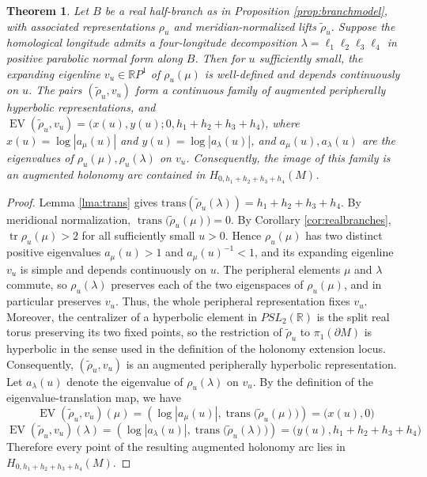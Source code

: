 \documentclass{article}
\theoremstyle{plain}
\newtheorem{theorem}{Theorem}[section]
\theoremstyle{definition}
\theoremstyle{plain}
\theoremstyle{plain}
\theoremstyle{plain}
\theoremstyle{remark}
\theoremstyle{remark}
\theoremstyle{plain}
\theoremstyle{plain}
\theoremstyle{plain}
\theoremstyle{plain}
\begin{document}
\begin{theorem}\label{thm:h00}
Let $B$ be a real half-branch as in Proposition \ref{prop:branchmodel}, with associated representations $\rho_u$ and meridian-normalized lifts $\widetilde\rho_u$. Suppose the homological longitude admits a four-longitude decomposition $\lambda=\ell_1\ell_2\ell_3\ell_4$ in positive parabolic normal form along $B$. Then for $u$ sufficiently small, the expanding eigenline $v_u\in\mathbb RP^1$ of $\rho_u(\mu)$ is well-defined and depends continuously on $u$. The pairs $(\widetilde\rho_u,v_u)$ form a continuous family of augmented peripherally hyperbolic representations, and $\operatorname{EV}(\widetilde\rho_u,v_u) = \bigl(x(u),y(u);0,h_1+h_2+h_3+h_4\bigr)$, where $x(u)=\log|a_\mu(u)|$ and $y(u)=\log|a_\lambda(u)|$, and $a_\mu(u),a_\lambda(u)$ are the eigenvalues of $\rho_u(\mu),\rho_u(\lambda)$ on $v_u$. Consequently, the image of this family is an augmented holonomy arc contained in $H_{0,h_1+h_2+h_3+h_4}(M)$.
\end{theorem}

\begin{proof}
Lemma \ref{lma:trans} gives $\mathrm{trans}(\widetilde\rho_u(\lambda)) = h_1+h_2+h_3+h_4$. By meridional normalization, $\operatorname{trans}\bigl(\widetilde\rho_u(\mu)\bigr)=0$. By Corollary \ref{cor:realbranches}, $\operatorname{tr}\rho_u(\mu)>2$ for all sufficiently small $u>0$. Hence $\rho_u(\mu)$ has two distinct positive eigenvalues $a_\mu(u)>1$ and $a_\mu(u)^{-1}<1$, and its expanding eigenline $v_u$ is simple and depends continuously on $u$. The peripheral elements $\mu$ and $\lambda$ commute, so $\rho_u(\lambda)$ preserves each of the two eigenspaces of $\rho_u(\mu)$, and in particular preserves $v_u$. Thus, the whole peripheral representation fixes $v_u$. Moreover, the centralizer of a hyperbolic element in $PSL_2(\mathbb R)$ is the split real torus preserving its two fixed points, so the restriction of $\widetilde\rho_u$ to $\pi_1(\partial M)$ is hyperbolic in the sense used in the definition of the holonomy extension locus. Consequently, $(\widetilde\rho_u,v_u)$ is an augmented peripherally hyperbolic representation. Let $a_\lambda(u)$ denote the eigenvalue of $\rho_u(\lambda)$ on $v_u$. By the definition of the eigenvalue-translation map, we have
\begin{equation*}
	\operatorname{EV}(\widetilde\rho_u,v_u)(\mu) = \left(\log|a_\mu(u)|,\operatorname{trans}\bigl(\widetilde\rho_u(\mu)\bigr)\right) = \bigl(x(u),0\bigr)
\end{equation*}
\begin{equation*}
	\operatorname{EV}(\widetilde\rho_u,v_u)(\lambda) = \left(\log|a_\lambda(u)|, \operatorname{trans} \bigl(\widetilde\rho_u(\lambda)\bigr)\right) = \bigl(y(u),h_1+h_2+h_3+h_4\bigr)
\end{equation*}
Therefore every point of the resulting augmented holonomy arc lies in $H_{0,h_1+h_2+h_3+h_4}(M)$.
\end{proof}
\end{document}
